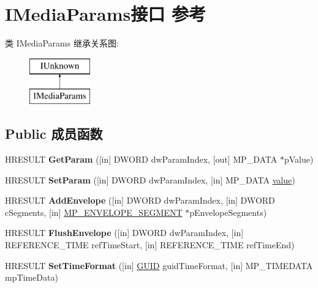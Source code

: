 \hypertarget{interface_i_media_params}{}\section{I\+Media\+Params接口 参考}
\label{interface_i_media_params}
类 I\+Media\+Params 继承关系图\+:\begin{figure}[H]
\begin{center}
\leavevmode
\includegraphics[height=2.000000cm]{interface_i_media_params}
\end{center}
\end{figure}
\subsection*{Public 成员函数}
\begin{DoxyCompactItemize}
\item 
\mbox{\label{interface_i_media_params_ad361c150ab0ef99c9e60cad1209eca35}} 
H\+R\+E\+S\+U\+LT {\bfseries Get\+Param} (\mbox{[}in\mbox{]} D\+W\+O\+RD dw\+Param\+Index, \mbox{[}out\mbox{]} M\+P\+\_\+\+D\+A\+TA $\ast$p\+Value)
\item 
\mbox{\label{interface_i_media_params_ace38e47b747e4687cb0532ef368a99e4}} 
H\+R\+E\+S\+U\+LT {\bfseries Set\+Param} (\mbox{[}in\mbox{]} D\+W\+O\+RD dw\+Param\+Index, \mbox{[}in\mbox{]} M\+P\+\_\+\+D\+A\+TA \hyperlink{unionvalue}{value})
\item 
\mbox{\label{interface_i_media_params_ab11a41e66b7829152fe6e9f0bb6a21a2}} 
H\+R\+E\+S\+U\+LT {\bfseries Add\+Envelope} (\mbox{[}in\mbox{]} D\+W\+O\+RD dw\+Param\+Index, \mbox{[}in\mbox{]} D\+W\+O\+RD c\+Segments, \mbox{[}in\mbox{]} \hyperlink{struct___m_p___e_n_v_e_l_o_p_e___s_e_g_m_e_n_t}{M\+P\+\_\+\+E\+N\+V\+E\+L\+O\+P\+E\+\_\+\+S\+E\+G\+M\+E\+NT} $\ast$p\+Envelope\+Segments)
\item 
\mbox{\label{interface_i_media_params_ab44ee7790e3de71295fe965c0613db8b}} 
H\+R\+E\+S\+U\+LT {\bfseries Flush\+Envelope} (\mbox{[}in\mbox{]} D\+W\+O\+RD dw\+Param\+Index, \mbox{[}in\mbox{]} R\+E\+F\+E\+R\+E\+N\+C\+E\+\_\+\+T\+I\+ME ref\+Time\+Start, \mbox{[}in\mbox{]} R\+E\+F\+E\+R\+E\+N\+C\+E\+\_\+\+T\+I\+ME ref\+Time\+End)
\item 
\mbox{\label{interface_i_media_params_a29ca33304cc008fc7b82348129eb19a9}} 
H\+R\+E\+S\+U\+LT {\bfseries Set\+Time\+Format} (\mbox{[}in\mbox{]} \hyperlink{interface_g_u_i_d}{G\+U\+ID} guid\+Time\+Format, \mbox{[}in\mbox{]} M\+P\+\_\+\+T\+I\+M\+E\+D\+A\+TA mp\+Time\+Data)
\end{DoxyCompactItemize}
